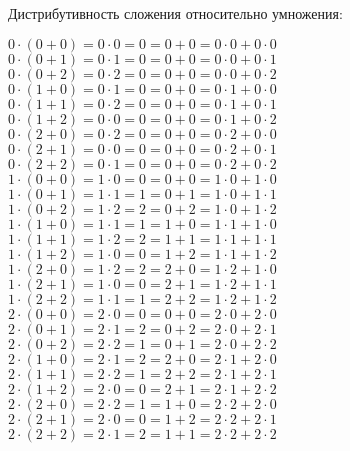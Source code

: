 \documentclass{article}
\begin{document}
	Дистрибутивность сложения относительно умножения: \\
	\begin{center}
		$0 \cdot (0 + 0) = 0 \cdot 0 = 0 = 0 + 0 = 0 \cdot 0 + 0 \cdot 0$ \\
		$0 \cdot (0 + 1) = 0 \cdot 1 = 0 = 0 + 0 = 0 \cdot 0 + 0 \cdot 1$ \\
		$0 \cdot (0 + 2) = 0 \cdot 2 = 0 = 0 + 0 = 0 \cdot 0 + 0 \cdot 2$ \\
		$0 \cdot (1 + 0) = 0 \cdot 1 = 0 = 0 + 0 = 0 \cdot 1 + 0 \cdot 0$ \\
		$0 \cdot (1 + 1) = 0 \cdot 2 = 0 = 0 + 0 = 0 \cdot 1 + 0 \cdot 1$ \\
		$0 \cdot (1 + 2) = 0 \cdot 0 = 0 = 0 + 0 = 0 \cdot 1 + 0 \cdot 2$ \\
		$0 \cdot (2 + 0) = 0 \cdot 2 = 0 = 0 + 0 = 0 \cdot 2 + 0 \cdot 0$ \\
		$0 \cdot (2 + 1) = 0 \cdot 0 = 0 = 0 + 0 = 0 \cdot 2 + 0 \cdot 1$ \\
		$0 \cdot (2 + 2) = 0 \cdot 1 = 0 = 0 + 0 = 0 \cdot 2 + 0 \cdot 2$ \\
		$1 \cdot (0 + 0) = 1 \cdot 0 = 0 = 0 + 0 = 1 \cdot 0 + 1 \cdot 0$ \\
		$1 \cdot (0 + 1) = 1 \cdot 1 = 1 = 0 + 1 = 1 \cdot 0 + 1 \cdot 1$ \\
		$1 \cdot (0 + 2) = 1 \cdot 2 = 2 = 0 + 2 = 1 \cdot 0 + 1 \cdot 2$ \\
		$1 \cdot (1 + 0) = 1 \cdot 1 = 1 = 1 + 0 = 1 \cdot 1 + 1 \cdot 0$ \\
		$1 \cdot (1 + 1) = 1 \cdot 2 = 2 = 1 + 1 = 1 \cdot 1 + 1 \cdot 1$ \\
		$1 \cdot (1 + 2) = 1 \cdot 0 = 0 = 1 + 2 = 1 \cdot 1 + 1 \cdot 2$ \\
		$1 \cdot (2 + 0) = 1 \cdot 2 = 2 = 2 + 0 = 1 \cdot 2 + 1 \cdot 0$ \\
		$1 \cdot (2 + 1) = 1 \cdot 0 = 0 = 2 + 1 = 1 \cdot 2 + 1 \cdot 1$ \\
		$1 \cdot (2 + 2) = 1 \cdot 1 = 1 = 2 + 2 = 1 \cdot 2 + 1 \cdot 2$ \\
		$2 \cdot (0 + 0) = 2 \cdot 0 = 0 = 0 + 0 = 2 \cdot 0 + 2 \cdot 0$ \\
		$2 \cdot (0 + 1) = 2 \cdot 1 = 2 = 0 + 2 = 2 \cdot 0 + 2 \cdot 1$ \\
		$2 \cdot (0 + 2) = 2 \cdot 2 = 1 = 0 + 1 = 2 \cdot 0 + 2 \cdot 2$ \\
		$2 \cdot (1 + 0) = 2 \cdot 1 = 2 = 2 + 0 = 2 \cdot 1 + 2 \cdot 0$ \\
		$2 \cdot (1 + 1) = 2 \cdot 2 = 1 = 2 + 2 = 2 \cdot 1 + 2 \cdot 1$ \\
		$2 \cdot (1 + 2) = 2 \cdot 0 = 0 = 2 + 1 = 2 \cdot 1 + 2 \cdot 2$ \\
		$2 \cdot (2 + 0) = 2 \cdot 2 = 1 = 1 + 0 = 2 \cdot 2 + 2 \cdot 0$ \\
		$2 \cdot (2 + 1) = 2 \cdot 0 = 0 = 1 + 2 = 2 \cdot 2 + 2 \cdot 1$ \\
		$2 \cdot (2 + 2) = 2 \cdot 1 = 2 = 1 + 1 = 2 \cdot 2 + 2 \cdot 2$ \\
	\end{center}
\end{document}
